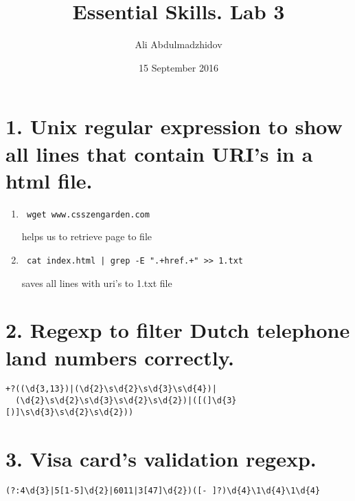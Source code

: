 \documentclass[10pt]{article}
\title{Essential Skills. Lab 3}
\date{15 September 2016}
\author{Ali Abdulmadzhidov}
\begin{document}
\renewcommand*\rmdefault{cmss}
  \maketitle
  \section{1. Unix regular expression to show all lines that contain URI's in a html file. \newline}
  \begin{enumerate}
  \item \begin{verbatim} wget www.csszengarden.com \end{verbatim} helps us to retrieve page to file
  \item \begin{verbatim} cat index.html | grep -E ".+href.+" >> 1.txt \end{verbatim} saves all lines with uri's to 1.txt file
  \end{enumerate}


  \section{2. Regexp to filter Dutch telephone land numbers correctly.\newline}
  \begin{verbatim}+?((\d{3,13})|(\d{2}\s\d{2}\s\d{3}\s\d{4})|
  (\d{2}\s\d{2}\s\d{3}\s\d{2}\s\d{2})|([(]\d{3}[)]\s\d{3}\s\d{2}\s\d{2}))\end{verbatim}

  \section{3. Visa card's validation regexp. \newline}
  \begin{verbatim}(?:4\d{3}|5[1-5]\d{2}|6011|3[47]\d{2})([- ]?)\d{4}\1\d{4}\1\d{4}\end{verbatim}
\end{document}
